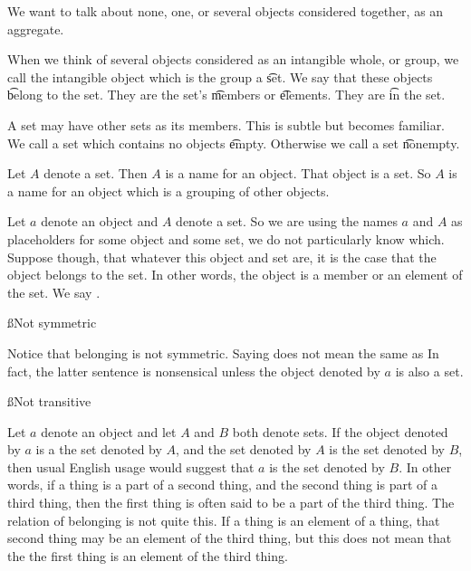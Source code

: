 

We want to talk about none, one, or several objects considered together, as an aggregate.


When we think of several objects considered as an intangible whole, or group, we call the intangible object which is the group a \t{set}.
We say that these objects \t{belong} to the set.
They are the set's \t{members} or \t{elements}.
They are \t{in} the set.


A set may have other sets as its members.
This is subtle but becomes familiar.
We call a set which contains no objects \t{empty}.
Otherwise we call a set \t{nonempty}.


Let $A$ denote a set.
Then $A$ is a name for an object.
That object is a set.
So $A$ is a name for an object which is a grouping of other objects.


Let $a$ denote an object and $A$ denote a set.
So we are using the names $a$ and $A$ as placeholders for some object and some set, we do not particularly know which.
Suppose though, that whatever this object and set are, it is the case that the object belongs to the set.
In other words, the object is a member or an element of the set.
We say .

\ss{Not symmetric}

Notice that belonging is not symmetric.
Saying  does not mean the same as 
In fact, the latter sentence is nonsensical unless the object denoted by $a$ is also a set.

\ss{Not transitive}

Let $a$ denote an object and let $A$ and $B$ both denote sets.
If the object denoted by $a$ is  a the set denoted by $A$, and the set denoted by $A$ is  the set denoted by $B$, then usual English usage would suggest that $a$ is  the set denoted by $B$.
In other words, if a thing is a part of a second thing, and the second thing is part of a third thing, then the first thing is often said to be a part of the third thing.
The relation of belonging is not quite this.
If a thing is an element of a thing, that second thing may be an element of the third thing, but this does not mean that the the first thing is an element of the third thing.

